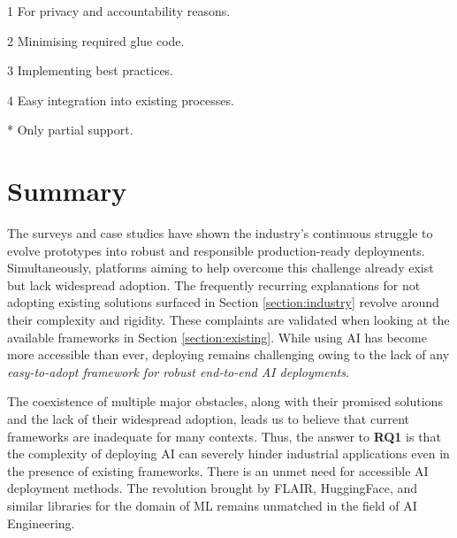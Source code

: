 \begin{table}
\begin{threeparttable}
\begin{tablenotes}
\item[1] For privacy and accountability reasons. \cite{bosch2021engineering}
\item[2] Minimising required glue code. \cite{sculley2015hidden}
\item[3] Implementing best practices. \cite{serban2020adoption,serban2021practices,john2020architecting}
\item[4] Easy integration into existing processes. \cite{haakman2021ai,thiee2021systematic}
\item[*] Only partial support.
\end{tablenotes}
\end{threeparttable}
\end{table}

\section{Summary}

The surveys and case studies have shown the industry's continuous struggle to evolve prototypes into robust and responsible production-ready deployments. Simultaneously, platforms aiming to help overcome this challenge already exist but lack widespread adoption. The frequently recurring explanations for not adopting existing solutions surfaced in Section \ref{section:industry} revolve around their complexity and rigidity. These complaints are validated when looking at the available frameworks in Section \ref{section:existing}. While using AI has become more accessible than ever, deploying remains challenging owing to the lack of any \textit{easy-to-adopt framework for robust end-to-end AI deployments}.

The coexistence of multiple major obstacles, along with their promised solutions and the lack of their widespread adoption, leads us to believe that current frameworks are inadequate for many contexts. Thus, the answer to \textbf{RQ1} is that the complexity of deploying AI can severely hinder industrial applications even in the presence of existing frameworks. There is an unmet need for accessible AI deployment methods. The revolution brought by FLAIR, HuggingFace, and similar libraries for the domain of ML remains unmatched in the field of AI Engineering.

